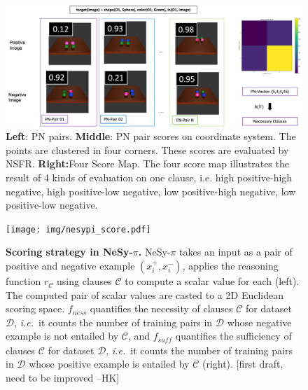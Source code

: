 \documentclass[
]{ceurart}
\newcommand{\hk}[1]{\textcolor{Apricot}{[#1 \textsc{--HK}]}}
\newcommand{\ie}{\emph{i.e.}~}
\begin{document}
	\begin{figure}[t]
		\centering
		\begin{minipage}{\textwidth}
			\includegraphics[width=\linewidth]{img/four_zone_explain.png} 
			\caption{\textbf{Left}: PN pairs. \textbf{Middle}: PN pair scores on coordinate system. The points are clustered in four corners. These scores are evaluated by NSFR. \textbf{Right:}Four Score Map. The four score map illustrates the result of 4 kinds of evaluation on one clause, i.e. high positive-high negative, high positive-low negative, low positive-high negative, low positive-low negative. }
			\label{fig:pn-pair}
		\end{minipage}
	\end{figure}
	\fi
	
	\begin{figure}[t]
		\centering
		\texttt{[image: img/nesypi\_score.pdf]}
		\caption{\textbf{Scoring strategy in NeSy-$\pi$.} NeSy-$\pi$ takes an input as a pair of positive and negative example $(x_i^+, x_i^-)$, applies the reasoning function $r_\mathcal{C}$ using clauses $\mathcal{C}$ to compute a scalar value for each (left). The computed pair of scalar values are casted to a 2D Euclidean scoring space. $f_\mathit{ness}$ quantifies the necessity of clauses $\mathcal{C}$ for dataset $\mathcal{D}$, \ie it counts the number of training pairs in $\mathcal{D}$ whose negative example is not entailed by $\mathcal{C}$, and $f_\mathit{suff}$ quantifies the sufficiency of clauses $\mathcal{C}$ for dataset $\mathcal{D}$, \ie it counts the number of training pairs in $\mathcal{D}$ whose positive example is entailed by $\mathcal{C}$  (right). \hk{first draft, need to be improved} }
		\label{fig:score}
	\end{figure}
	
	
	
	
\end{document}
